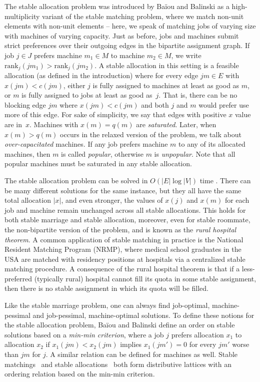 \documentclass{llncs}
\begin{document}
 The stable allocation problem was
introduced by Ba\"iou and Balinski \cite{DBLP:journals/mor/BaiouB02}
as a high-multiplicity variant of the stable matching problem, where
we match non-unit elements with non-unit elements -- here, we speak of
matching jobs of varying size with machines of varying capacity.  Just
as before, jobs and machines submit strict preferences over their
outgoing edges in the bipartite assignment graph.  If job $j \in J$
prefers machine $m_1 \in M$ to machine $m_2 \in M$, we write
$\text{rank}_j(jm_1) > \text{rank}_j(jm_2)$.  A stable allocation in
this setting is a feasible allocation (as defined in the introduction)
where for every edge $jm \in E$ with $x(jm) < c(jm)$, either $j$ is
fully assigned to machines at least as good as $m$, or $m$ is fully
assigned to jobs at least as good as~$j$.  That is, there can be no
blocking edge $jm$ where $x(jm) < c(jm)$ and both $j$ and $m$ would
prefer use more of this edge.  For sake of simplicity, we say that
edges with positive $x$ value are in~$x$. Machines with $x(m) = q(m)$
are \emph{saturated}. Later, when $x(m) > q(m)$ occurs in the relaxed
version of the problem, we talk about \emph{over-capacitated}
machines. If any job prefers machine $m$ to any of its allocated
machines, then $m$ is called \emph{popular}, otherwise $m$ is
\emph{unpopular}. Note that all popular machines must be saturated in
any stable allocation.

The stable allocation problem can be solved in $O(|E| \log |V|)$ time
\cite{DBLP:journals/algorithmica/DeanM10}.  There can be many
different solutions for the same instance, but they all have the same
total allocation $|x|$, and even stronger, the values of $x(j)$ and
$x(m)$ for each job and machine remain unchanged across all stable
allocations.  This holds for both stable marriage and stable
allocation, moreover, even for stable roommate, the non-bipartite version of the problem, and is known as the {\em rural hospital theorem}.  A
common application of stable matching in practice is the National
Resident Matching Program (NRMP), where medical school graduates in
the USA are matched with residency positions at hospitals via a
centralized stable matching procedure.  A consequence of the rural
hospital theorem is that if a less-preferred (typically rural)
hospital cannot fill its quota in some stable assignment, then there
is no stable assignment in which its quota will be filled.

Like the stable marriage problem, one can always find job-optimal,
machine-pessimal and job-pessimal, machine-optimal solutions.  To
define these notions for the stable allocation problem, Ba\"iou and
Balinski \cite{DBLP:journals/mor/BaiouB02} define an order on stable
solutions based on a {\em min-min criterion}, where a job $j$ prefers
allocation $x_1$ to allocation $x_2$ if $x_1(jm) < x_2(jm)$ implies
$x_1(jm') = 0$ for every $jm'$ worse than $jm$ for $j$.  A similar
relation can be defined for machines as well.  Stable
matchings~\cite{Knuth:1976:MSR} and stable
allocations~\cite{DBLP:journals/mor/BaiouB02} both form distributive
lattices with an ordering relation based on the min-min criterion.
\end{document}
